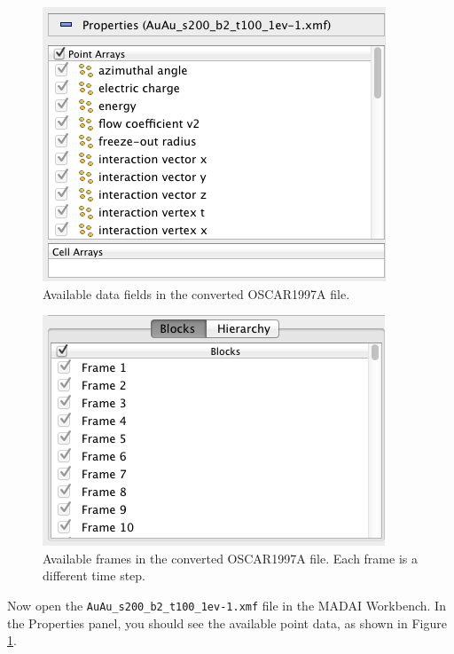 \documentclass[12pt]{article}
\begin{document}
\begin{figure}[htbp]
   \centering
   \includegraphics[scale=.5]{images/OSCAR1997A_PointArrays.png} %
   \caption{Available data fields  in the converted OSCAR1997A file.}
   \label{fig:OSCAR1997A_PointArrays}
\end{figure}

\begin{figure}[htbp]
   \centering
   \includegraphics[scale=.5]{images/OSCAR1997A_Blocks.png} %
   \caption{Available frames  in the converted OSCAR1997A file. Each frame is a different time step.}
   \label{fig:OSCAR1997A_Blocks}
\end{figure}

Now open the \texttt{AuAu\_s200\_b2\_t100\_1ev-1.xmf} file in the MADAI Workbench. In the Properties panel, you should see the available point data, as shown in Figure \ref{fig:OSCAR1997A_PointArrays}.

\end{document}
